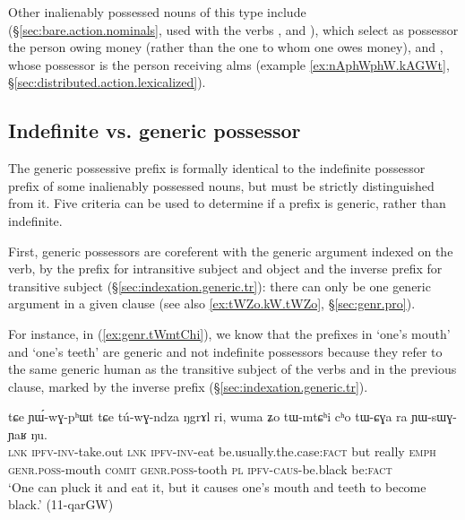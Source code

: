 Other inalienably possessed nouns of this type include  (§\ref{sec:bare.action.nominals}, used with the verbs ,  and ), which select as possessor the person owing money (rather than the one to whom one owes money), and , whose possessor is the person receiving alms (example \ref{ex:nAphWphW.kAGWt}, §\ref{sec:distributed.action.lexicalized}).

\subsection{Indefinite vs. generic possessor} \label{sec:indef.genr.poss}
The generic possessive prefix  is formally identical to the indefinite possessor prefix of some inalienably possessed nouns, but must be strictly distinguished from it. Five criteria can be used to determine if a  prefix is generic, rather than indefinite.

First, generic possessors are coreferent with the generic argument indexed on the verb, by the prefix  for intransitive subject and object and the inverse prefix  for transitive subject (§\ref{sec:indexation.generic.tr}): there can only be one generic argument in a given clause (see also \ref{ex:tWZo.kW.tWZo}, §\ref{sec:genr.pro}).

For instance, in (\ref{ex:genr.tWmtChi}), we know that the  prefixes in  `one's mouth' and  `one's teeth' are generic and not indefinite possessors because they refer to the same generic human as the transitive subject of the verbs  and  in the previous clause, marked by the inverse prefix (§\ref{sec:indexation.generic.tr}).

\begin{exe}
\ex \label{ex:genr.tWmtChi}
\gll tɕe ɲɯ́-wɣ-pʰɯt tɕe tú-wɣ-ndza ŋgrɤl ri, wuma ʑo tɯ-mtɕʰi cʰo tɯ-ɕɣa ra ɲɯ-sɯɣ-ɲaʁ ŋu. \\
\textsc{lnk} \textsc{ipfv}-\textsc{inv}-take.out \textsc{lnk} \textsc{ipfv}-\textsc{inv}-eat be.usually.the.case:\textsc{fact} but really \textsc{emph} \textsc{genr}.\textsc{poss}-mouth \textsc{comit} \textsc{genr}.\textsc{poss}-tooth \textsc{pl} \textsc{ipfv}-\textsc{caus}-be.black be:\textsc{fact} \\
\glt `One can pluck it and eat it, but it causes one's mouth and teeth to become black.' (11-qarGW) 
\end{exe}

